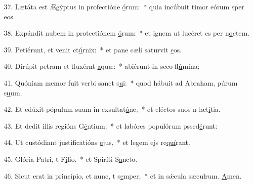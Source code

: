 37. Lætáta est Ægýptus in profectióne \uline{ó}rum:~* quia incúbuit timor eórum sper \uline{e}os.\par 
38. Expándit nubem in protectiónem \uline{ó}rum:~* et ignem ut lucéret es per n\uline{o}ctem.\par 
39. Petiérunt, et venit ct\uline{ú}rnix:~* et pane cæli saturvit \uline{e}os.\par 
40. Dirúpit petram et fluxérnt \uline{a}quæ:~* abiérunt in scco fl\uline{ú}mina;\par 
41. Quóniam memor fuit verbi sanct s\uline{u}i:~* quod hábuit ad Abraham, púrum s\uline{u}um.\par 
42. Et edúxit pópulum suum in exsultat\uline{ó}ne,~* et eléctos suos n læt\uline{í}tia.\par 
43. Et dedit illis regións G\uline{é}ntium:~* et labóres populórum pssed\uline{é}runt:\par 
44. Ut custódiant justificatións \uline{e}jus,~* et legem ejs re\uline{quí}rant.\par 
45. Glória Patri, t F\uline{í}lio,~* et Spiríti S\uline{a}ncto.\par 
46. Sicut erat in princípio, et nunc, t s\uline{e}mper,~* et in sǽcula sæculrum. \uline{A}men.\par 

